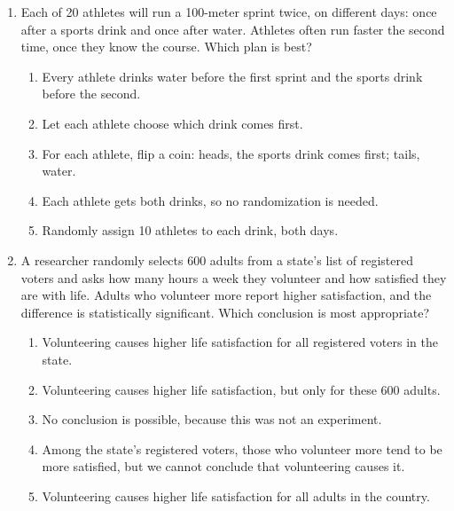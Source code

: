 \documentclass[12pt]{article}
\begin{document}
\begin{enumerate}[leftmargin=1.9em, itemsep=0.13in]
  \boxguard[15]
  \item Each of 20 athletes will run a 100-meter sprint twice, on different days: once after a
        sports drink and once after water. Athletes often run faster the second time, once they
        know the course. Which plan is best?
        \begin{enumerate}[label=\textbf{(\Alph*)}, leftmargin=2.2em, itemsep=2pt]
          \item Every athlete drinks water before the first sprint and the sports drink before the
                second.
          \item Let each athlete choose which drink comes first.
          \item For each athlete, flip a coin: heads, the sports drink comes first; tails, water.
          \item Each athlete gets both drinks, so no randomization is needed.
          \item Randomly assign 10 athletes to each drink, both days.\hfill{}\rule[-0.2in]{0pt}{0.48in}
        \end{enumerate}

  \boxguard[15]
  \item A researcher randomly selects 600 adults from a state's list of registered voters and
        asks how many hours a week they volunteer and how satisfied they are with life. Adults
        who volunteer more report higher satisfaction, and the difference is statistically
        significant. Which conclusion is most appropriate?
        \begin{enumerate}[label=\textbf{(\Alph*)}, leftmargin=2.2em, itemsep=2pt]
          \item Volunteering causes higher life satisfaction for all registered voters in the state.
          \item Volunteering causes higher life satisfaction, but only for these 600 adults.
          \item No conclusion is possible, because this was not an experiment.
          \item Among the state's registered voters, those who volunteer more tend to be more
                satisfied, but we cannot conclude that volunteering causes it.
          \item Volunteering causes higher life satisfaction for all adults in the country.\hfill{}\rule[-0.2in]{0pt}{0.48in}
        \end{enumerate}

\end{enumerate}
\end{document}

